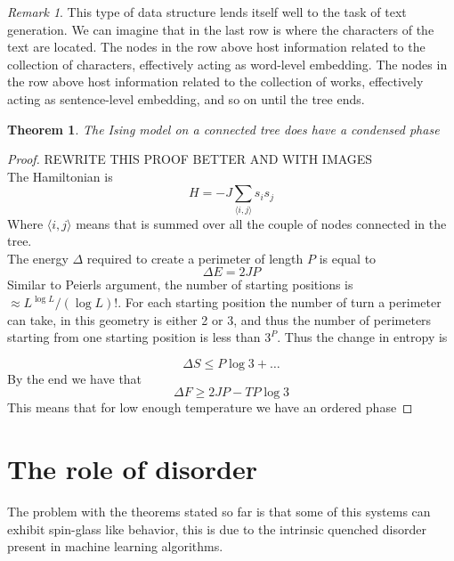 \documentclass{article}
\newtheorem{theorem}{Theorem}[section]
\theoremstyle{definition}
\theoremstyle{remark}
\newtheorem*{remark}{Remark}
\begin{document}
\begin{remark}
    This type of data structure lends itself well to the task of text generation. We can imagine that in the last row is where the characters of the text are located. The nodes in the row above host information related to the collection of characters, effectively acting as word-level embedding. The nodes in the row above host information related to the collection of works, effectively acting as sentence-level embedding, and so on until the tree ends.
\end{remark}
\begin{theorem}
    The Ising model on a connected tree does have a condensed phase
\end{theorem}
\begin{proof}
    REWRITE THIS PROOF BETTER AND WITH IMAGES\\
    The Hamiltonian is
    \begin{equation}
        H=-J\sum_{\langle i,j\rangle} s_is_j
    \end{equation}
    Where $\langle i,j\rangle$ means that is summed over all the couple of nodes connected in the tree.\\
    The energy $\Delta$ required to create a perimeter of length $P$ is equal to 
    \[
        \Delta E=2JP
    \]
    Similar to Peierls argument, the number of starting positions is $\approx L^{\log L}/(\log L)!$. For each starting position the number of turn a perimeter can take, in this geometry is either 2 or 3, and thus the number of perimeters starting from one starting position is less than $3^P$. Thus the change in entropy is

    \begin{equation}
        \Delta S\le P\log 3 + \dots
    \end{equation}
    By the end we have that 
    \begin{equation}
        \Delta F \ge 2JP - TP\log 3
    \end{equation}
    This means that for low enough temperature we have an ordered phase
\end{proof}
\section{The role of disorder}
    \label{sec:disorder}
    The problem with the theorems stated so far is that some of this systems can exhibit spin-glass like behavior, this is due to the intrinsic quenched disorder present in machine learning algorithms.
\end{document}
